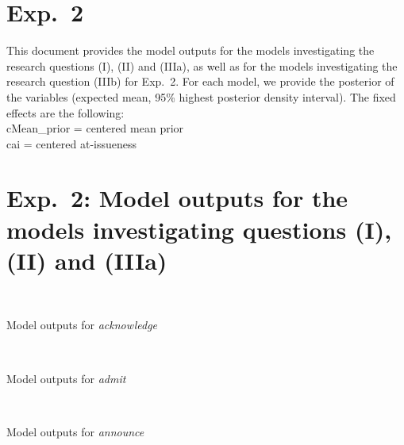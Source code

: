 \documentclass[11pt,fleqn]{article}
\newcommand{\6}{\mbox{$[\hspace*{-.6mm}[$}}
\newcommand{\9}{\mbox{$]\hspace*{-.6mm}]$}}
\begin{document}
\section*{Exp.~2}

This document provides the model outputs for the models investigating the research questions (I), (II) and (IIIa), as well as for the models investigating the research question (IIIb) for Exp.~2. For each model, we provide the posterior of the variables (expected mean, 95\% highest posterior density interval). The fixed effects are the following:
\\ cMean\_prior = centered mean prior
\\ cai = centered at-issueness

\newpage

\section*{Exp.~2: Model outputs for the models investigating questions (I), (II) and (IIIa)}

\begin{table}[htbp]
\centering

  \\ 

\caption{Model outputs for {\em acknowledge}}
\end{table}

\begin{table}[htbp]
\centering

  \\ 

\caption{Model outputs for {\em admit}}
\end{table}

\begin{table}[htbp]
\centering

  \\ 

\caption{Model outputs for {\em announce}}
\end{table}
\end{document}

